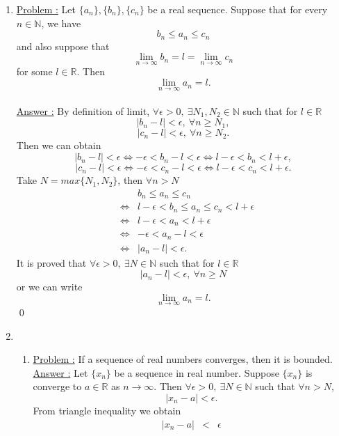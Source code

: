 \documentclass[a4paper,10pt]{article}
\newcommand{\R}{\mathbb{R}}
\newcommand{\N}{\mathbb{N}}
\begin{document}
\begin{enumerate}
	\item \underline{Problem :} Let $ \{a_{n}\}, \{b_{n}\}, \{c_{n}\} $ be a real sequence. Suppose that for every $ n \in \N $, we have
	\[ b_{n} \leq a_{n} \leq c_{n} \]
	and also suppose that
	\[ \lim\limits_{n \rightarrow \infty} b_{n} = l = \lim\limits_{n \rightarrow \infty} c_{n} \]
	for some $ l \in \R $. Then \[ \lim\limits_{n \rightarrow \infty} a_{n} = l. \]\\
	\underline{Answer :} By definition of limit, $ \forall \epsilon>0 , \ \exists N_{1}, N_{2} \in \N $ such that for $ l \in \R $
	\[ |b_{n}-l| < \epsilon, \ \forall n \geq N_{1}, \]
	\[ |c_{n}-l| < \epsilon, \ \forall n \geq N_{2}. \]
	Then we can obtain
	\[ |b_{n}-l| < \epsilon \Leftrightarrow -\epsilon < b_{n}-l < \epsilon \Leftrightarrow l-\epsilon < b_{n} < l + \epsilon,\]
	\[ |c_{n}-l| < \epsilon \Leftrightarrow -\epsilon < c_{n}-l < \epsilon \Leftrightarrow l-\epsilon < c_{n} < l + \epsilon.\]
	Take $ N = max \{N_{1},N_{2}\} $, then $ \forall n > N $
	\begin{eqnarray}\nonumber
	 && b_{n} \leq a_{n} \leq c_{n} \\ \nonumber
	 & \Leftrightarrow & l-\epsilon < b_{n} \leq a_{n} \leq c_{n} < l + \epsilon \\ \nonumber
	 & \Leftrightarrow & l-\epsilon < a_{n} < l + \epsilon\\ \nonumber
	 & \Leftrightarrow & -\epsilon < a_{n}-l < \epsilon \\ \nonumber
	 & \Leftrightarrow & |a_{n}-l| < \epsilon.
	\end{eqnarray}
	It is proved that $ \forall \epsilon>0 , \ \exists N \in \N $ such that for $ l \in \R $
	\[ |a_{n}-l| < \epsilon, \ \forall n \geq N \]
	or we can write
	\[ \lim\limits_{n \rightarrow \infty} a_{n} = l. \] \qed
	\newpage \item 
	\begin{enumerate}
		\item \underline{Problem :} If a sequence of real numbers converges, then it is bounded.\\
		\underline{Answer :} Let $ \{x_{n}\} $ be a sequence in real number. Suppose $ \{x_{n}\} $ is converge to $ a \in \R $ as $ n \rightarrow \infty $. Then $ \forall \epsilon > 0, \ \exists N\in \N $ such that $ \forall n > N $, \[|x_{n}-a|<\epsilon.\]
		From triangle inequality we obtain
		\begin{eqnarray} \nonumber
		|x_{n}-a|&<&\epsilon \\ \nonumber

\end{eqnarray}
\end{enumerate}
\end{enumerate}
\end{document}
